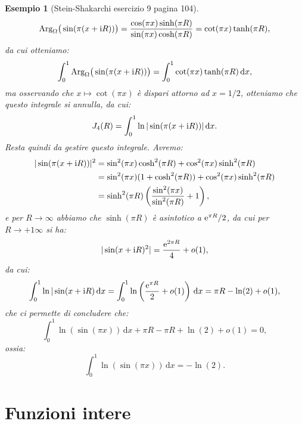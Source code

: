 \documentclass[11pt]{book}
\theoremstyle{Definizione}
\theoremstyle{TeoremaProposizioneLemmaCorollarioCongettura}
\theoremstyle{OsservazioneNotaEsempio}
\newtheorem{myes}{Esempio}[section]
\newcommand{\Arg}[1][]{\textup{Arg}_{#1}}
\renewcommand{\i}{\textup{i}}
\newcommand{\e}{\textup{e}}
\renewcommand{\d}{\mathrm{d}}
\newcommand{\dx}{\,\d x}
\begin{document}
\begin{myes}[Stein-Shakarchi esercizio 9 pagina 104]
$$
\Arg[\Omega]\big(\sin(\pi (x+\i R))\big) = \frac{\cos(\pi x)\sinh(\pi R)}{\sin(\pi x)\cosh(\pi R)} = \cot(\pi x)\tanh(\pi R),
$$
da cui otteniamo:
$$
\int_{0}^{1} \Arg[\Omega]\big(\sin(\pi (x+ \i R))\big) = \int_{0}^{1}\cot(\pi x)\tanh(\pi R)\dx,
$$
ma osservando che $x \longmapsto \cot(\pi x)$ è dispari attorno ad $x = 1/2$, otteniamo che questo integrale si annulla, da cui:
$$
J_4(R) = \int_{0}^{1} \ln|\sin(\pi(x+\i R))|\dx.
$$
Resta quindi da gestire questo integrale. Avremo:
\begin{align*}
|\sin(\pi(x+\i R))|^2 &= \sin^2(\pi x)\cosh^2(\pi R)+ \cos^2(\pi x) \sinh^2(\pi R)\\
&= \sin^2(\pi x)(1+\cosh^2(\pi R))+ \cos^2(\pi x)\sinh^2(\pi R)\\
&= \sinh^2(\pi R) \left(\frac{\sin^2(\pi x)}{\sin^2(\pi R)}+1\right),
\end{align*}
e per $R \to \infty$ abbiamo che $\sinh(\pi R)$ è asintotico a $\e^{\pi R}/2$, da cui per $R\to +1\infty$ si ha:
$$
|\sin(x+\i R)^2| = \frac{\e^{2\pi R}}{4}+o(1),
$$
da cui:
$$
\int_{0}^{1} \ln|\sin(x+\i R)\dx = \int_{0}^{1} \ln\left(\frac{\e^{\pi R}}{2}+o(1)\right)\dx = \pi R-\ln(2) +o(1),
$$
che ci permette di concludere che:
$$
\int_{0}^{1}\ln(\sin(\pi x))\dx + \pi R - \pi R + \ln(2)+o(1)  = 0,
$$
ossia:
$$
\int_{0}^{1}\ln(\sin(\pi x))\dx = -\ln(2).
$$
\end{myes}
\chapter{Funzioni intere}
\end{document}
